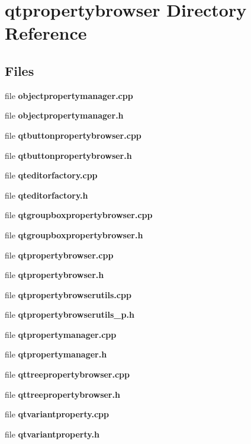 \section{qtpropertybrowser Directory Reference}
\label{dir_b867a8245255169759e710dc504ec054}
\subsection*{Files}
\begin{DoxyCompactItemize}
\item 
file {\bf objectpropertymanager.\+cpp}
\item 
file {\bf objectpropertymanager.\+h}
\item 
file {\bf qtbuttonpropertybrowser.\+cpp}
\item 
file {\bf qtbuttonpropertybrowser.\+h}
\item 
file {\bf qteditorfactory.\+cpp}
\item 
file {\bf qteditorfactory.\+h}
\item 
file {\bf qtgroupboxpropertybrowser.\+cpp}
\item 
file {\bf qtgroupboxpropertybrowser.\+h}
\item 
file {\bf qtpropertybrowser.\+cpp}
\item 
file {\bf qtpropertybrowser.\+h}
\item 
file {\bf qtpropertybrowserutils.\+cpp}
\item 
file {\bf qtpropertybrowserutils\+\_\+p.\+h}
\item 
file {\bf qtpropertymanager.\+cpp}
\item 
file {\bf qtpropertymanager.\+h}
\item 
file {\bf qttreepropertybrowser.\+cpp}
\item 
file {\bf qttreepropertybrowser.\+h}
\item 
file {\bf qtvariantproperty.\+cpp}
\item 
file {\bf qtvariantproperty.\+h}
\end{DoxyCompactItemize}
